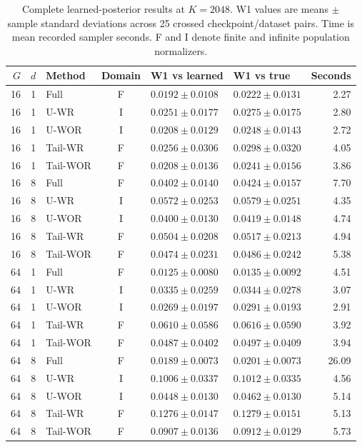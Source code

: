 \begin{table}[htbp]
 \centering
 \caption{Complete learned-posterior results at $K=2048$. W1 values are means $\pm$ sample standard deviations across 25 crossed checkpoint/dataset pairs. Time is mean recorded sampler seconds. F and I denote finite and infinite population normalizers.}
 \label{tab:learned-2048}
 \small
 \begin{tabular}{rrlcllr}
 \toprule
 $G$ & $d$ & Method & Domain & W1 vs learned & W1 vs true & Seconds\\
 \midrule

16 & 1 & Full & F & $0.0192\pm0.0108$ & $0.0222\pm0.0131$ & 2.27\\
16 & 1 & U-WR & I & $0.0251\pm0.0177$ & $0.0275\pm0.0175$ & 2.80\\
16 & 1 & U-WOR & I & $0.0208\pm0.0129$ & $0.0248\pm0.0143$ & 2.72\\
16 & 1 & Tail-WR & F & $0.0256\pm0.0306$ & $0.0298\pm0.0320$ & 4.05\\
16 & 1 & Tail-WOR & F & $0.0208\pm0.0136$ & $0.0241\pm0.0156$ & 3.86\\
\midrule
16 & 8 & Full & F & $0.0402\pm0.0140$ & $0.0424\pm0.0157$ & 7.70\\
16 & 8 & U-WR & I & $0.0572\pm0.0253$ & $0.0579\pm0.0251$ & 4.35\\
16 & 8 & U-WOR & I & $0.0400\pm0.0130$ & $0.0419\pm0.0148$ & 4.74\\
16 & 8 & Tail-WR & F & $0.0504\pm0.0208$ & $0.0517\pm0.0213$ & 4.94\\
16 & 8 & Tail-WOR & F & $0.0474\pm0.0231$ & $0.0486\pm0.0242$ & 5.38\\
\midrule
64 & 1 & Full & F & $0.0125\pm0.0080$ & $0.0135\pm0.0092$ & 4.51\\
64 & 1 & U-WR & I & $0.0335\pm0.0259$ & $0.0344\pm0.0278$ & 3.07\\
64 & 1 & U-WOR & I & $0.0269\pm0.0197$ & $0.0291\pm0.0193$ & 2.91\\
64 & 1 & Tail-WR & F & $0.0610\pm0.0586$ & $0.0616\pm0.0590$ & 3.92\\
64 & 1 & Tail-WOR & F & $0.0487\pm0.0402$ & $0.0497\pm0.0409$ & 3.94\\
\midrule
64 & 8 & Full & F & $0.0189\pm0.0073$ & $0.0201\pm0.0073$ & 26.09\\
64 & 8 & U-WR & I & $0.1006\pm0.0337$ & $0.1012\pm0.0335$ & 4.56\\
64 & 8 & U-WOR & I & $0.0448\pm0.0130$ & $0.0462\pm0.0130$ & 5.14\\
64 & 8 & Tail-WR & F & $0.1276\pm0.0147$ & $0.1279\pm0.0151$ & 5.13\\
64 & 8 & Tail-WOR & F & $0.0907\pm0.0136$ & $0.0912\pm0.0129$ & 5.73\\
\bottomrule
\end{tabular}
\end{table}
